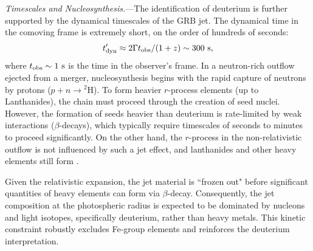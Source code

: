 \documentclass[prd,twocolumn,amsmath,amssymb,aps]{revtex4-2} %
\begin{document}
\textit{Timescales and Nucleosynthesis.}---The identification of deuterium is further supported by the dynamical timescales of the GRB jet. %
The dynamical time in the comoving frame is extremely short, on the order of hundreds of seconds:
\begin{equation}
t'_{\rm dyn} \approx 2\Gamma t_{\rm obs}/(1+z) \sim 300 \text{ s},
\end{equation}
where $t_{\rm obs} \sim 1 \ \text{s}$ is the time in the observer's frame.
In a neutron-rich outflow ejected from a merger, nucleosynthesis begins with the rapid capture of neutrons by protons ($p + n \rightarrow {^2\text{H}}$). To form heavier $r$-process elements (up to Lanthanides), the chain must proceed through the creation of seed nuclei. However, the formation of seeds heavier than deuterium is rate-limited by weak interactions ($\beta$-decays), which typically require timescales of seconds to minutes to proceed significantly. On the other hand, the $r$-process in the non-relativistic outflow is not influenced by such a jet effect, and lanthanides and other heavy elements still form \cite{2017Natur.551...80K}. 

Given the relativistic expansion, the jet material is ``frozen out" before significant quantities of heavy elements can form via $\beta$-decay. Consequently, the jet composition at the photospheric radius is expected to be dominated by nucleons and light isotopes, specifically deuterium, rather than heavy metals. This kinetic constraint robustly excludes Fe-group elements and reinforces the deuterium interpretation.
\end{document}

